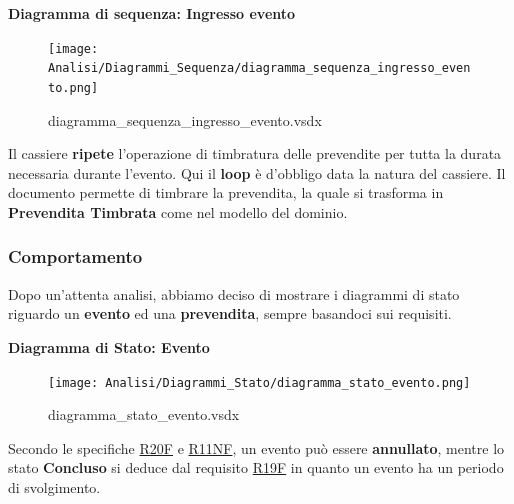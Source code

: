 \documentclass[a4paper]{article}
\begin{document}
\newpage

\textbf{Diagramma di sequenza: Ingresso evento}

\begin{figure}[H]
    \texttt{[image: Analisi/Diagrammi\_Sequenza/diagramma\_sequenza\_ingresso\_evento.png]}
    \centering
    \caption{diagramma\_sequenza\_ingresso\_evento.vsdx}
\end{figure}

Il cassiere \textbf{ripete} l'operazione di timbratura delle prevendite per tutta la durata necessaria durante l'evento. Qui il \textbf{loop} è d'obbligo data la natura del cassiere. Il documento permette di timbrare la prevendita, la quale si trasforma in \textbf{Prevendita Timbrata} come nel modello del dominio.

\newpage

\subsubsection{Comportamento}

Dopo un'attenta analisi, abbiamo deciso di mostrare i diagrammi di stato riguardo un \textbf{evento} ed una \textbf{prevendita}, sempre basandoci sui requisiti.



\textbf{Diagramma di Stato: Evento}

\begin{figure}[H]
    \texttt{[image: Analisi/Diagrammi\_Stato/diagramma\_stato\_evento.png]}
    \centering
    \caption{diagramma\_stato\_evento.vsdx}
\end{figure}

Secondo le specifiche \hyperlink{R20F}{R20F} e \hyperlink{R11NF}{R11NF}, un evento può essere \textbf{annullato}, mentre lo stato \textbf{Concluso} si deduce dal requisito \hyperlink{R19F}{R19F} in quanto un evento ha un periodo di svolgimento.\\
\end{document}
